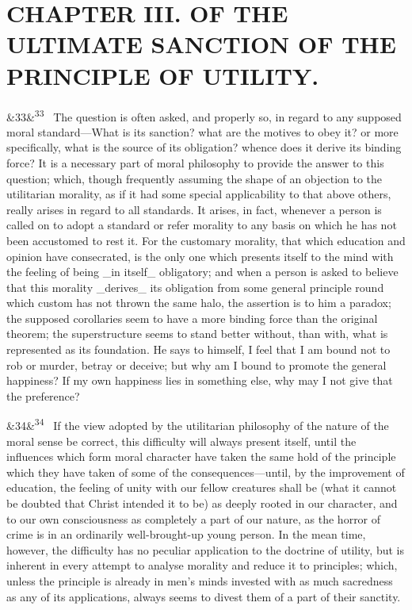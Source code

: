 \documentclass[12pt]{article}
\newcommand{\para}[1][]{\par\noindent\ifx&#1&\else\textsuperscript{\footnotesize #1}~\fi}
\begin{document}
\section*{CHAPTER III. OF THE ULTIMATE SANCTION OF THE PRINCIPLE OF UTILITY.}

\para[33] The question is often asked, and properly so, in regard to any supposed moral standard---What is its sanction? what are the motives to obey it? or more specifically, what is the source of its obligation? whence does it derive its binding force? It is a necessary part of moral philosophy to provide the answer to this question; which, though frequently assuming the shape of an objection to the utilitarian morality, as if it had some special applicability to that above others, really arises in regard to all standards. It arises, in fact, whenever a person is called on to adopt a standard or refer morality to any basis on which he has not been accustomed to rest it. For the customary morality, that which education and opinion have consecrated, is the only one which presents itself to the mind with the feeling of being \_in itself\_ obligatory; and when a person is asked to believe that this morality \_derives\_ its obligation from some general principle round which custom has not thrown the same halo, the assertion is to him a paradox; the supposed corollaries seem to have a more binding force than the original theorem; the superstructure seems to stand better without, than with, what is represented as its foundation. He says to himself, I feel that I am bound not to rob or murder, betray or deceive; but why am I bound to promote the general happiness? If my own happiness lies in something else, why may I not give that the preference?

\para[34] If the view adopted by the utilitarian philosophy of the nature of the moral sense be correct, this difficulty will always present itself, until the influences which form moral character have taken the same hold of the principle which they have taken of some of the consequences---until, by the improvement of education, the feeling of unity with our fellow creatures shall be (what it cannot be doubted that Christ intended it to be) as deeply rooted in our character, and to our own consciousness as completely a part of our nature, as the horror of crime is in an ordinarily well-brought-up young person. In the mean time, however, the difficulty has no peculiar application to the doctrine of utility, but is inherent in every attempt to analyse morality and reduce it to principles; which, unless the principle is already in men's minds invested with as much sacredness as any of its applications, always seems to divest them of a part of their sanctity.
\end{document}
